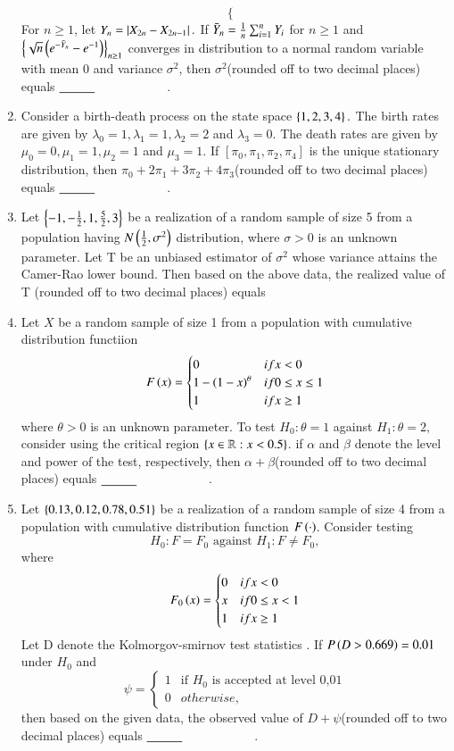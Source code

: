 \documentclass[journal,12pt,onecolumn]{IEEEtran}
\theoremstyle{remark}
\begin{document}
\begin{enumerate}
\[\begin{cases}
\end{cases}
\]
For $n\geq1$, let $Y_n=\left\vert X_{2n}-X_{2n-1}\right\vert.$ If $\Bar{Y}_n=\frac{1}{n}\sum_{i=1}^{n}Y_i$ for $n\geq 1$ and $\left\{\sqrt{n}\left(e^{-\Bar{Y}_n}-e^{-1}\right)\right\}_{n \geq 1}$ converges in distribution to a normal random variable with mean 0 and variance $\sigma^2$, then $\sigma^2$(rounded off to two decimal places) equals $\makebox[3cm][l]{\underline{\hspace{1cm}}}$.
\item Consider a birth-death process on the state space $\left\{1,2,3,4\right\}.$ The birth rates are given by $\lambda_0=1,\lambda_1=1,\lambda_2=2$ and $\lambda_3=0$. The death rates are given by $\mu_0=0,\mu_1=1,\mu_2=1$ and $\mu_3=1$. If $[\pi_0,\pi_1,\pi_2,\pi_4]$ is the unique stationary distribution, then $\pi_0+2\pi_1+3\pi_2+4\pi_3$(rounded off to two decimal places) equals $\makebox[3cm][l]{\underline{\hspace{1cm}}}$.
\item Let $\left\{-1,-\frac{1}{2},1,\frac{5}{2},3\right\}$ be a realization of a random sample of size 5 from a population having $N\left(\frac{1}{2},\sigma^2\right)$ distribution, where $\sigma>0$ is an unknown parameter. Let T be an unbiased estimator of $\sigma^2$ whose variance attains the Camer-Rao lower bound. Then based on the above data, the realized value of T (rounded off to two decimal places) equals
\item  Let $X$ be a random sample of size 1 from a population with cumulative distribution functiion \[
F\left(x\right)=\begin{cases}
    0 &if x<0\\
    1-\left(1-x\right)^\theta & if 0\leq x\leq1\\
    1 & if x\geq1
\end{cases}
\] 
where $\theta>0$ is an unknown parameter. To test $H_0:\theta=1$ against $H_1:\theta=2,$ consider using the critical region $\left\{x \in \mathbb{R}:x<0.5\right\}$. if $\alpha$ and $\beta$ denote the level and power of the test, respectively, then $\alpha+\beta$(rounded off to two decimal places) equals $\makebox[3cm][l]{\underline{\hspace{1cm}}}$.
\item Let $\left\{0.13,0.12,0.78,0.51\right\}$ be a realization of a random sample of size 4 from a population with cumulative distribution function $F\left(\cdot\right)$. Consider testing $$H_0:F=F_0 \text{ against } H_1:F\neq F_0,$$ where \[
F_0\left(x\right)=\begin{cases}
    0 & if x<0\\
    x & if 0\leq x <1\\
    1 & if x\geq1
\end{cases}
\]
Let D denote the Kolmorgov-smirnov test statistics . If $P\left(D>0.669\right)=0.01$ under $H_0$ and \[
\psi=\begin{cases}
    1 & \text{if } H_0 \text{ is accepted at level 0,01}\\
    0 & otherwise,
\end{cases}
\]
then based on the given data, the observed value of $D+\psi$(rounded off to two decimal places) equals  $\makebox[3cm][l]{\underline{\hspace{1cm}}}$.
\end{enumerate} 
\end{document}
